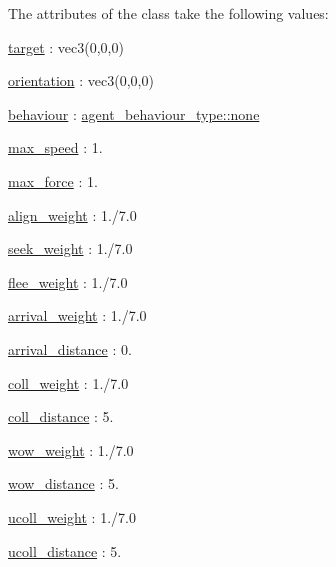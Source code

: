 The attributes of the class take the following values\+:
\begin{DoxyItemize}
\item \hyperlink{classphysim_1_1particles_1_1agent__particle_a0658207e11a5d39844856233ae8bf2cb}{target} \+: vec3(0,0,0)
\item \hyperlink{classphysim_1_1particles_1_1agent__particle_a87b2554699454e6850f1d2b48e278f63}{orientation} \+: vec3(0,0,0)
\item \hyperlink{classphysim_1_1particles_1_1agent__particle_af219e3f46630bb7f51f3d00952ed4f1c}{behaviour} \+: \hyperlink{namespacephysim_1_1particles_a033757595f7862a0fc8a389d79bf9c88a334c4a4c42fdb79d7ebc3e73b517e6f8}{agent\+\_\+behaviour\+\_\+type\+::none}
\item \hyperlink{classphysim_1_1particles_1_1agent__particle_a3e34a9a7fc82cbad0226b7b925b5ba22}{max\+\_\+speed} \+: 1.
\item \hyperlink{classphysim_1_1particles_1_1agent__particle_a57909cb85564f4432754000ed570d88a}{max\+\_\+force} \+: 1.
\item \hyperlink{classphysim_1_1particles_1_1agent__particle_a119da4916df4f5c52f13170725295f20}{align\+\_\+weight} \+: 1./7.0
\item \hyperlink{classphysim_1_1particles_1_1agent__particle_a853c72c7dbd902a126af1a90d50af222}{seek\+\_\+weight} \+: 1./7.0
\item \hyperlink{classphysim_1_1particles_1_1agent__particle_ad7824cd0742b42f803542d8b4d5eae98}{flee\+\_\+weight} \+: 1./7.0
\item \hyperlink{classphysim_1_1particles_1_1agent__particle_aaeb579f8b30b7604d7205bb7aff5197b}{arrival\+\_\+weight} \+: 1./7.0
\item \hyperlink{classphysim_1_1particles_1_1agent__particle_ab042fe6b2ee2ebb86bf0de7c23c09d04}{arrival\+\_\+distance} \+: 0.
\item \hyperlink{classphysim_1_1particles_1_1agent__particle_af026f67b9cd8c190fdee03ef143d6e83}{coll\+\_\+weight} \+: 1./7.0
\item \hyperlink{classphysim_1_1particles_1_1agent__particle_ae851f1172de706931eebf33b642983e8}{coll\+\_\+distance} \+: 5.
\item \hyperlink{classphysim_1_1particles_1_1agent__particle_acc82ad218207d618d25128ac4a885e11}{wow\+\_\+weight} \+: 1./7.0
\item \hyperlink{classphysim_1_1particles_1_1agent__particle_aea89f1ac8529f17432d20280cff39411}{wow\+\_\+distance} \+: 5.
\item \hyperlink{classphysim_1_1particles_1_1agent__particle_ab25fc01e8a49f57aca2be031f048edea}{ucoll\+\_\+weight} \+: 1./7.0
\item \hyperlink{classphysim_1_1particles_1_1agent__particle_abe0c2e35c753ee40c5fb9408932d6513}{ucoll\+\_\+distance} \+: 5. 
\end{DoxyItemize}\mbox{\label{classphysim_1_1particles_1_1agent__particle_ac4eabcfb94d1c5769415f8822556be8b}} 
